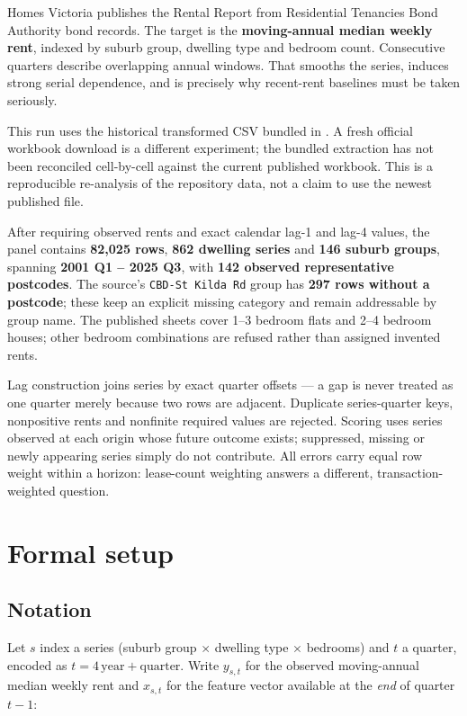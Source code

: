 \documentclass[11pt,a4paper]{article}
\begin{document}
Homes Victoria publishes the Rental Report from Residential Tenancies Bond Authority bond records. The target is the \textbf{moving-annual median weekly rent}, indexed by suburb group, dwelling type and bedroom count. Consecutive quarters describe overlapping annual windows. That smooths the series, induces strong serial dependence, and is precisely why recent-rent baselines must be taken seriously.

This run uses the historical transformed CSV bundled in . A fresh official workbook download is a different experiment; the bundled extraction has not been reconciled cell-by-cell against the current published workbook. This is a reproducible re-analysis of the repository data, not a claim to use the newest published file.

After requiring observed rents and exact calendar lag-1 and lag-4 values, the panel contains \textbf{82,025 rows}, \textbf{862 dwelling series} and \textbf{146 suburb groups}, spanning \textbf{2001 Q1 -- 2025 Q3}, with \textbf{142 observed representative postcodes}. The source's \texttt{CBD{-}St Kilda Rd} group has \textbf{297 rows without a postcode}; these keep an explicit missing category and remain addressable by group name. The published sheets cover 1--3 bedroom flats and 2--4 bedroom houses; other bedroom combinations are refused rather than assigned invented rents.

Lag construction joins series by exact quarter offsets --- a gap is never treated as one quarter merely because two rows are adjacent. Duplicate series-quarter keys, nonpositive rents and nonfinite required values are rejected. Scoring uses series observed at each origin whose future outcome exists; suppressed, missing or newly appearing series simply do not contribute. All errors carry equal row weight within a horizon: lease-count weighting answers a different, transaction-weighted question.

\section{Formal setup}

\subsection{Notation}

Let \(s\) index a series (suburb group $\times$ dwelling type $\times$ bedrooms) and \(t\) a quarter, encoded as \(t = 4\,\text{year} + \text{quarter}\). Write \(y_{s,t}\) for the observed moving-annual median weekly rent and \(x_{s,t}\) for the feature vector available at the \emph{end} of quarter \(t-1\):
\end{document}
